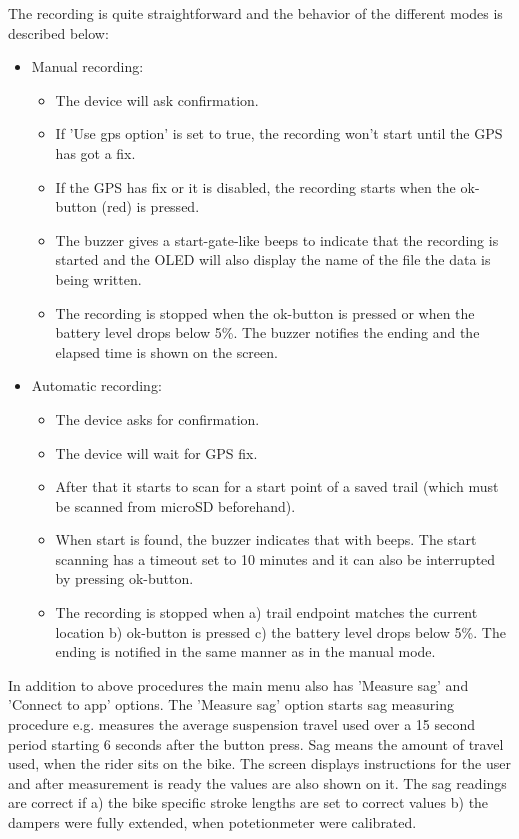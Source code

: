 \documentclass[a4paper,11pt]{article} %
\begin{document}
The recording is quite straightforward and the behavior of the different modes is described below:

\begin{itemize}
    \item Manual recording:
    \begin{itemize}
        \item The device will ask confirmation.
        \item If 'Use gps option' is set to true, the recording won't start until the GPS has got a fix.
        \item If the GPS has fix or it is disabled, the recording starts when the ok-button (red) is pressed.
        \item The buzzer gives a start-gate-like beeps to indicate that the recording is started and the OLED will also display the name of the file the data is being written.
        \item The recording is stopped when the ok-button is pressed or when the battery level drops below 5\%. The buzzer notifies the ending and the elapsed time is shown on the screen.
    \end{itemize}

    \item Automatic recording:
    \begin{itemize}
        \item The device asks for confirmation.
        \item The device will wait for GPS fix.
        \item After that it starts to scan for a start point of a saved trail (which must be scanned from microSD beforehand).
        \item When start is found, the buzzer indicates that with beeps. The start scanning has a timeout set to 10 minutes and it can also be interrupted by pressing ok-button.
        \item The recording is stopped when a) trail endpoint matches the current location b) ok-button is pressed c) the battery level drops below 5\%. The ending is notified in the same manner as in the manual mode.
    \end{itemize}
\end{itemize}

In addition to above procedures the main menu also has 'Measure sag' and 'Connect to app' options. The 'Measure sag' option starts sag measuring procedure e.g. measures the average suspension travel used over a 15 second period starting 6 seconds after the button press. Sag means the amount of travel used, when the rider sits on the bike. The screen displays instructions for the user and after measurement is ready the values are also shown on it. The sag readings are correct if a) the bike specific stroke lengths are set to correct values b) the dampers were fully extended, when potetionmeter were calibrated.
\end{document}
